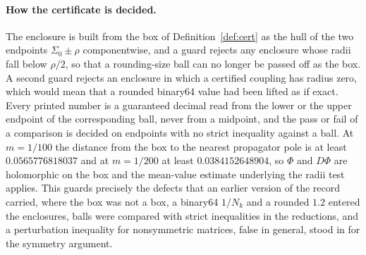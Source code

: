 \documentclass[11pt]{article}
\theoremstyle{definition}
\theoremstyle{remark}
\begin{document}
\paragraph{How the certificate is decided.} The enclosure is built from the box of Definition~\ref{def:cert} as the hull of the two endpoints $\Sigma_0\pm\rho$ componentwise, and a guard rejects any enclosure whose radii fall below $\rho/2$, so that a rounding-size ball can no longer be passed off as the box. A second guard rejects an enclosure in which a certified coupling has radius zero, which would mean that a rounded binary64 value had been lifted as if exact. Every printed number is a guaranteed decimal read from the lower or the upper endpoint of the corresponding ball, never from a midpoint, and the pass or fail of a comparison is decided on endpoints with no strict inequality against a ball. At $m=1/100$ the distance from the box to the nearest propagator pole is at least $0.0565776818037$ and at $m=1/200$ at least $0.0384152648904$, so $\Phi$ and $D\Phi$ are holomorphic on the box and the mean-value estimate underlying the radii test applies. This guards precisely the defects that an earlier version of the record carried, where the box was not a box, a binary64 $1/N_k$ and a rounded $1.2$ entered the enclosures, balls were compared with strict inequalities in the reductions, and a perturbation inequality for nonsymmetric matrices, false in general, stood in for the symmetry argument.
\end{document}
